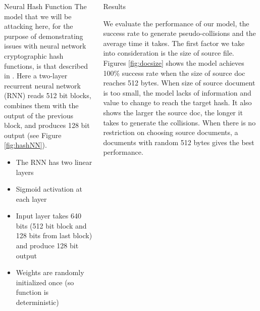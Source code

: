 \documentclass[final]{beamer}
\newlength{\onecolwid}
\newlength{\twocolwid}
\begin{document}
\begin{frame}[t]
\begin{columns}[t]
\begin{column}{\twocolwid}
\begin{columns}[t,totalwidth=\twocolwid] %

\begin{column}{\onecolwid}\vspace{-.6in} %


\begin{block}{Neural Hash Function}
The model that we will be attacking here, for the purpose of demonstrating
issues with neural network cryptographic hash functions, is that described
in \cite{hash1}.  Here a two-layer recurrent neural network (RNN)
reads 512 bit blocks, combines them with the output of the previous block,
and produces 128 bit output (see Figure \ref{fig:hashNN}).

\begin{itemize}
    \item The RNN has two linear layers
    \item Sigmoid activation at each layer
    \item Input layer takes 640 bits (512 bit block and 128 bits from last 
        block) and produce 128 bit output
    \item Weights are randomly initialized once (so function is deterministic)
\end{itemize}

\end{block}


\end{column} %

\begin{column}{\onecolwid}\vspace{-.6in} %


\begin{block}{Results}

We evaluate the performance of our model, the success rate to generate pseudo-collisions and the average time it takes. The first factor we take into consideration is the size of source file. Figures \ref{fig:docsize} shows the model achieves 100\% success rate when the size of source doc reaches 512 bytes. When size of source document is too small, the model lacks of information and value to change to reach the target hash. It also shows the larger the source doc, the longer it takes to generate the collisions. When there is no restriction on choosing source documents, a documents with random 512 bytes gives the best performance.


\end{block}
\end{column}
\end{columns}
\end{column}
\end{columns}
\end{frame}
\end{document}
